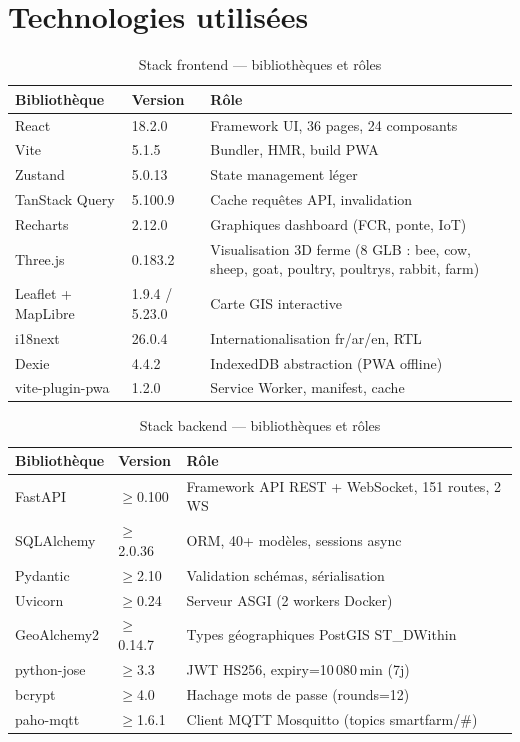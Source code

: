 \section{Technologies utilisées}

\begin{table}[H]
\centering
\caption{Stack frontend — bibliothèques et rôles}
\label{tab:frontend_stack}
\begin{tabularx}{\linewidth}{llX}
\toprule
\textbf{Bibliothèque} & \textbf{Version} & \textbf{Rôle} \\
\midrule
React          & 18.2.0 & Framework UI, 36 pages, 24 composants \\
Vite           & 5.1.5  & Bundler, HMR, build PWA \\
Zustand        & 5.0.13 & State management léger \\
TanStack Query & 5.100.9& Cache requêtes API, invalidation \\
Recharts       & 2.12.0 & Graphiques dashboard (FCR, ponte, IoT) \\
Three.js       & 0.183.2& Visualisation 3D ferme (8 GLB : bee, cow, sheep, goat, poultry, poultrys, rabbit, farm) \\
Leaflet + MapLibre & 1.9.4 / 5.23.0 & Carte GIS interactive \\
i18next        & 26.0.4 & Internationalisation fr/ar/en, RTL \\
Dexie          & 4.4.2  & IndexedDB abstraction (PWA offline) \\
vite-plugin-pwa& 1.2.0  & Service Worker, manifest, cache \\
\bottomrule
\end{tabularx}
\end{table}

\begin{table}[H]
\centering
\caption{Stack backend — bibliothèques et rôles}
\label{tab:backend_stack}
\begin{tabularx}{\linewidth}{llX}
\toprule
\textbf{Bibliothèque} & \textbf{Version} & \textbf{Rôle} \\
\midrule
FastAPI        & $\geq$0.100  & Framework API REST + WebSocket, 151 routes, 2 WS \\
SQLAlchemy     & $\geq$2.0.36 & ORM, 40+ modèles, sessions async \\
Pydantic       & $\geq$2.10   & Validation schémas, sérialisation \\
Uvicorn        & $\geq$0.24   & Serveur ASGI (2 workers Docker) \\
GeoAlchemy2    & $\geq$0.14.7 & Types géographiques PostGIS ST\_DWithin \\
python-jose    & $\geq$3.3    & JWT HS256, expiry=10\,080\,min (7j) \\
bcrypt         & $\geq$4.0    & Hachage mots de passe (rounds=12) \\
paho-mqtt      & $\geq$1.6.1  & Client MQTT Mosquitto (topics smartfarm/\#) \\
\bottomrule
\end{tabularx}
\end{table}

